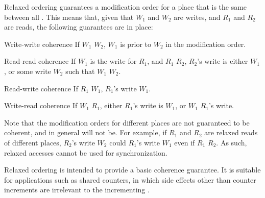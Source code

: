 \endsubsection%


Relaxed ordering guarantees a modification order for a place that is
the same between all . This means that, given that $W_1$ and
$W_2$ are writes, and $R_1$ and $R_2$ are reads, the following
guarantees are in place:

\beginlist
\item{Write-write coherence} If $W_1$  $W_2$,
  $W_1$ is prior to $W_2$ in the modification order.
\item{Read-read coherence} If $W_1$ is the write for $R_1$, and $R_1$
   $R_2$, $R_2$'s write is either $W_1$, or some
  write $W_2$ such that $W_1$  $W_2$.
\item{Read-write coherence} If $R_1$  $W_1$,
  $R_1$'s write  $W_1$.
\item{Write-read coherence} If $W_1$  $R_1$, either
  $R_1$'s write is $W_1$, or $W_1$  $R_1$'s
  write.
\endlist

Note that the modification orders for different places are not
guaranteed to be coherent, and in general will not be. For example, if
$R_1$ and $R_2$ are relaxed reads of different places, $R_2$'s write
$W_2$ could  $R_1$'s write $W_1$ even if $R_1$
 $R_2$. As such, relaxed accesses cannot be used
for synchronization.

Relaxed ordering is intended to provide a basic coherence guarantee. It is
suitable for applications such as shared counters, in which side effects other
than counter increments are irrelevant to the incrementing
.

\endsubsection%